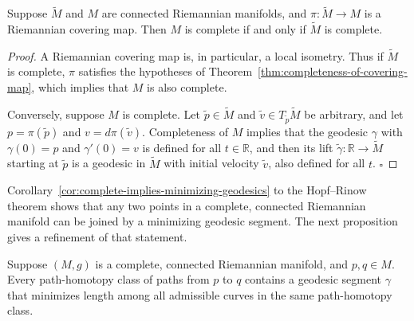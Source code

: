 \begin{corollary}
\label{cor:complete-iff-covering-complete}

Suppose $\tilde{M}$ and $M$ are connected Riemannian manifolds, and $\pi: \tilde{M} \to M$ is a Riemannian covering map. Then $M$ is complete if and only if $\tilde{M}$ is complete.
\end{corollary}

\begin{proof}
A Riemannian covering map is, in particular, a local isometry. Thus if $\tilde{M}$ is complete, $\pi$ satisfies the hypotheses of Theorem~\ref{thm:completeness-of-covering-map}, which implies that $M$ is also complete.

Conversely, suppose $M$ is complete. Let $\tilde{p} \in \tilde{M}$ and $\tilde{v} \in T_{\tilde{p}}\tilde{M}$ be arbitrary, and let $p = \pi(\tilde{p})$ and $v = d\pi(\tilde{v})$. Completeness of $M$ implies that the geodesic $\gamma$ with $\gamma(0) = p$ and $\gamma'(0) = v$ is defined for all $t \in \mathbb{R}$, and then its lift $\tilde{\gamma}: \mathbb{R} \to \tilde{M}$ starting at $\tilde{p}$ is a geodesic in $\tilde{M}$ with initial velocity $\tilde{v}$, also defined for all $t$. $\square$
\end{proof}

Corollary~\ref{cor:complete-implies-minimizing-geodesics} to the Hopf--Rinow theorem shows that any two points in a complete, connected Riemannian manifold can be joined by a minimizing geodesic segment. The next proposition gives a refinement of that statement.

\begin{proposition}
\label{prop:path-homotopy-contains-minimizing-geodesic}

Suppose $(M, g)$ is a complete, connected Riemannian manifold, and $p, q \in M$. Every path-homotopy class of paths from $p$ to $q$ contains a geodesic segment $\gamma$ that minimizes length among all admissible curves in the same path-homotopy class.
\end{proposition}


